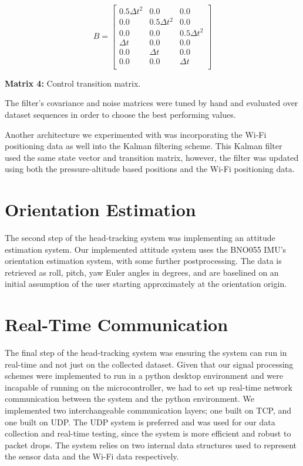 \[
B =
\begin{bmatrix}
0.5\Delta t^2 & 0.0 & 0.0 \\
0.0 & 0.5\Delta t^2 & 0.0 \\
0.0 & 0.0 & 0.5\Delta t^2 \\
\Delta t & 0.0 & 0.0 \\
0.0 & \Delta t & 0.0 \\
0.0 & 0.0 & \Delta t \\
\end{bmatrix}
\]
\begin{center}
\textbf{Matrix 4:} Control transition matrix.
\end{center}

\par
The filter's covariance and noise matrices were tuned by hand and evaluated over dataset sequences in order to choose the best performing values.
\par
Another architecture we experimented with was incorporating the Wi-Fi positioning data as well into the Kalman filtering scheme. This Kalman filter used the same state vector and transition matrix, however, the filter was updated using both the pressure-altitude based positions and the Wi-Fi positioning data.

\section{Orientation Estimation}
The second step of the head-tracking system was implementing an attitude estimation system. Our implemented attitude system uses the BNO055 IMU's orientation estimation system, with some further postprocessing. The data is retrieved as roll, pitch, yaw Euler angles in degrees, and are baselined on an initial assumption of the user starting approximately at the orientation origin. \cite{bno055}

\section{Real-Time Communication}
The final step of the head-tracking system was ensuring the system can run in real-time and not just on the collected dataset. Given that our signal processing schemes were implemented to run in a python desktop environment and were incapable of running on the microcontroller, we had to set up real-time network communication between the system and the python environment. We implemented two interchangeable communication layers; one built on TCP, and one built on UDP. The UDP system is preferred and was used for our data collection and real-time testing, since the system is more efficient and robust to packet drops. The system relies on two internal data structures used to represent the sensor data and the Wi-Fi data respectively.
\par

